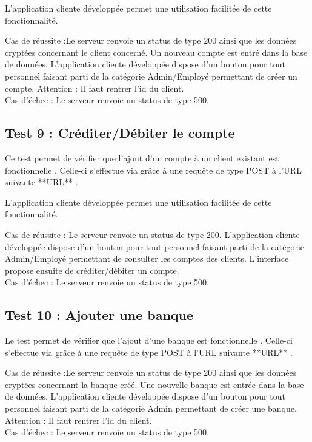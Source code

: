 L'application cliente développée permet une utilisation facilitée de cette fonctionnalité. 

Cas de réussite :Le serveur renvoie un status de type 200 ainsi que les données cryptées concernant le client concerné. Un nouveau compte est entré dans la base de données.
L'application cliente développée dispose d'un bouton pour tout personnel faisant parti de la catégorie Admin/Employé permettant de créer un compte.
Attention : Il faut rentrer l'id du client.
\\
Cas d'échec : Le serveur renvoie un status de type 500.

\subsection{Test 9 : Créditer/Débiter le compte}

Ce test permet de vérifier que l'ajout d'un compte à un client existant est fonctionnelle .
Celle-ci s'effectue via grâce à une requête de type POST à l'URL suivante **URL** .

L'application cliente développée permet une utilisation facilitée de cette fonctionnalité. 

Cas de réussite : Le serveur renvoie un status de type 200.
L'application cliente développée dispose d'un bouton pour tout personnel faisant parti de la catégorie Admin/Employé permettant de consulter les comptes des clients.
L'interface propose ensuite de créditer/débiter un compte.
\\
Cas d'échec : Le serveur renvoie un status de type 500.

\subsection{Test 10 : Ajouter une banque}

Le test permet de vérifier que l'ajout d'une banque est fonctionnelle .
Celle-ci s'effectue via grâce à une requête de type POST à l'URL suivante **URL** .

Cas de réussite :Le serveur renvoie un status de type 200 ainsi que les données cryptées concernant la banque créé. Une nouvelle banque est entrée dans la base de données.
L'application cliente développée dispose d'un bouton pour tout personnel faisant parti de la catégorie Admin permettant de créer une banque.
Attention : Il faut rentrer l'id du client.
\\
Cas d'échec : Le serveur renvoie un status de type 500.


